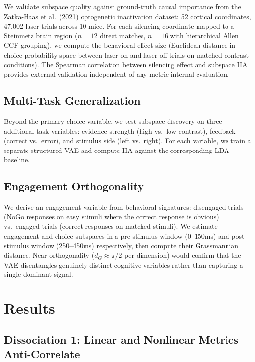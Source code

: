 \documentclass{article}
\begin{document}
We validate subspace quality against ground-truth causal importance from the Zatka-Haas et al.\ (2021) optogenetic inactivation dataset: 52 cortical coordinates, 47,002 laser trials across 10 mice. For each silencing coordinate mapped to a Steinmetz brain region ($n = 12$ direct matches, $n = 16$ with hierarchical Allen CCF grouping), we compute the behavioral effect size (Euclidean distance in choice-probability space between laser-on and laser-off trials on matched-contrast conditions). The Spearman correlation between silencing effect and subspace IIA provides external validation independent of any metric-internal evaluation.

\subsection{Multi-Task Generalization}

Beyond the primary choice variable, we test subspace discovery on three additional task variables: evidence strength (high vs.\ low contrast), feedback (correct vs.\ error), and stimulus side (left vs.\ right). For each variable, we train a separate structured VAE and compute IIA against the corresponding LDA baseline.

\subsection{Engagement Orthogonality}

We derive an engagement variable from behavioral signatures: disengaged trials (NoGo responses on easy stimuli where the correct response is obvious) vs.\ engaged trials (correct responses on matched stimuli). We estimate engagement and choice subspaces in a pre-stimulus window (0--150ms) and post-stimulus window (250--450ms) respectively, then compute their Grassmannian distance. Near-orthogonality ($d_G \approx \pi/2$ per dimension) would confirm that the VAE disentangles genuinely distinct cognitive variables rather than capturing a single dominant signal.

\section{Results}

\subsection{Dissociation 1: Linear and Nonlinear Metrics Anti-Correlate}
\end{document}
